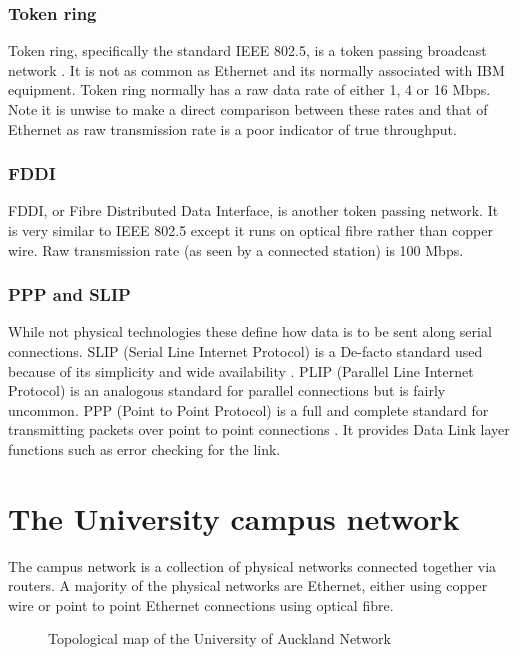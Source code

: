 \subsubsection{Token ring}

Token ring, specifically the standard IEEE 802.5, is a token passing
broadcast network \cite{IEEE:Tokenring}.  It is not as common as
Ethernet and its normally associated with IBM equipment.  Token ring
normally has a raw data rate of either 1, 4 or 16 Mbps.  Note it is
unwise to make a direct comparison between these rates and that of
Ethernet as raw transmission rate is a poor indicator of true
throughput.

\subsubsection{FDDI}

FDDI, or Fibre Distributed Data Interface, is another token passing
network.  It is very similar to IEEE 802.5 except it runs on optical
fibre rather than copper wire.  Raw transmission rate (as seen by a
connected station) is 100 Mbps.

\subsubsection{PPP and SLIP}

While not physical technologies these define how data is to be sent
along serial connections.  SLIP (Serial Line Internet Protocol) is a
De-facto standard used because of its simplicity and wide availability
\cite{RFC:1055}.  PLIP (Parallel Line Internet Protocol) is an
analogous standard for parallel connections but is fairly uncommon.
PPP (Point to Point Protocol) is a full and complete standard for
transmitting packets over point to point connections \cite{RFC:1661}.
It provides Data Link layer functions such as error checking for the
link.

\section{The University campus network}

The campus network is a collection of physical networks connected
together via routers.  A majority of the physical networks are
Ethernet, either using copper wire or point to point Ethernet
connections using optical fibre.

\begin{figure}
\leavevmode
{}
\caption{Topological map of the University of Auckland Network}
\label{map:uni}
\end{figure}

